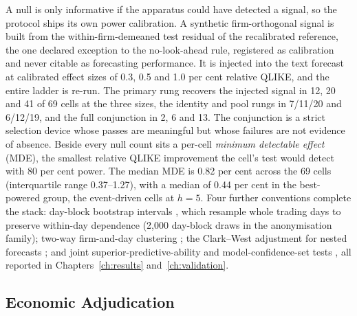 A null is only informative if the apparatus could have detected a signal, so the protocol ships its own power calibration. A synthetic firm-orthogonal signal is built from the within-firm-demeaned test residual of the recalibrated reference, the one declared exception to the no-look-ahead rule, registered as calibration and never citable as forecasting performance. It is injected into the text forecast at calibrated effect sizes of 0.3, 0.5 and 1.0 per cent relative QLIKE, and the entire ladder is re-run. %
The primary rung recovers the injected signal in 12, 20 and 41 of 69 cells at the three sizes, the identity and pool rungs in 7/11/20 and 6/12/19, and the full conjunction in 2, 6 and 13. %
The conjunction is a strict selection device whose passes are meaningful but whose failures are not evidence of absence. Beside every null count sits a per-cell \emph{minimum detectable effect} (MDE), the smallest relative QLIKE improvement the cell's test would detect with 80 per cent power. The median MDE is 0.82 per cent across the 69 cells (interquartile range 0.37--1.27), with a median of 0.44 per cent in the best-powered group, the event-driven cells at $h=5$. %
Four further conventions complete the stack: day-block bootstrap intervals \cite{politis1994stationary}, which resample whole trading days to preserve within-day dependence (2{,}000 day-block draws in the anonymisation family); %
two-way firm-and-day clustering \cite{cameron2011twoway}; the Clark--West adjustment for nested forecasts \cite{clarkwest2007}; and joint superior-predictive-ability and model-confidence-set tests \cite{hansen2005spa,hansen2011mcs}, all reported in Chapters~\ref{ch:results} and~\ref{ch:validation}.

\subsection{Economic Adjudication}
\label{sec:design-econ}

